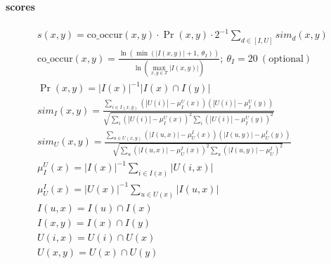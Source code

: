 \paragraph{scores}
\begin{gather}
    s(x,y)=
        \text{co\_occur}(x,y)
        \cdot \Pr(x,y)
        \cdot 2^{-1}
        \sum_{d \in [I, U]} sim_{d}(x,y) 
        \label{eq:tags_distances} \\
    \text{co\_occur}(x,y)=
        \frac{\ln(\min (|I(x,y)| + 1,~ \theta_{I}))}
        {\ln(\max_{x, y \in T} |I(x,y)|)};
        ~\theta_{I}=20~(\text{optional}) \\
    \Pr(x,y)=|I(x)|^{-1}|I(x)\cap I(y)| \\ 
    sim_{I}(x,y)
        =\frac{\sum_{i\in I(x,y)}(|U(i)| - \mu_{I}^{U}(x))(|U(i)| - \mu_{I}^{U}(y))}
        {\sqrt{\sum_{i}(|U(i)| - \mu_{I}^{U}(x))^{2}\sum_{i}(|U(i)| - \mu_{I}^{U}(y))^{2}}} \\
    sim_{U}(x,y)
        =\frac{\sum_{u \in U(x, y)} (|I(u,x)| - \mu_{U}^{I}(x)) (|I(u,y)| - \mu_{U}^{I}(y))}
        {\sqrt{\sum_{u} (|I(u,x)| - \mu_{U}^{I}(x))^{2}\sum_{u}(|I(u,y)| - \mu_{U}^{I})^{2}}} \\
    \mu_{I}^{U}(x)=|I(x)|^{-1}\sum_{i \in I(x)} |U(i,x)| \\
    \mu_{U}^{I}(x)=|U(x)|^{-1}\sum_{u \in U(x)} |I(u,x)| \\
    I(u,x)=I(u) \cap I(x) \\
    I(x,y)=I(x) \cap I(y) \\
    U(i,x)=U(i) \cap U(x) \\
    U(x,y)=U(x) \cap U(y)
\end{gather}